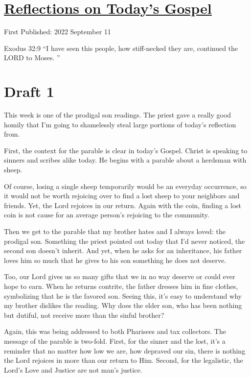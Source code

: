 \documentclass[12pt]{article}[titlepage]
\newcommand{\say}[1]{``#1''}
\newcommand{\1}{\={a}}
\newcommand{\2}{\={e}}
\newcommand{\3}{\={\i}}
\newcommand{\4}{\=o}
\newcommand{\5}{\=u}
\newcommand{\6}{\={A}}
\renewcommand{\,}{\textsuperscript{,}}
\begin{document}
\doublespacing
\section{\href{reflections-on-readings-24-ordinary-c-22.html}{Reflections on Today's Gospel}}
First Published: 2022 September 11

Exodus 32:9 \say{I have seen this people, how stiff-necked they are, continued the LORD to Moses. }

\section{Draft 1}
This week is one of the prodigal son readings.
The priest gave a really good homily that I'm going to shamelessly steal large portions of today's reflection from.

First, the context for the parable is clear in today's Gospel.
Christ is speaking to sinners and scribes alike today.
He begins with a parable about a herdsman with sheep.

Of course, losing a single sheep temporarily would be an everyday occurrence, so it would not be worth rejoicing over to find a lost sheep to your neighbors and friends.
Yet, the Lord rejoices in our return.
Again with the coin, finding a lost coin is not cause for an average person's rejoicing to the community.

Then we get to the parable that my brother hates and I always loved: the prodigal son.
Something the priest pointed out today that I'd never noticed, the second son doesn't inherit.
And yet, when he asks for an inheritance, his father loves him so much that he gives to his son something he does not deserve.

Too, our Lord gives us so many gifts that we in no way deserve or could ever hope to earn.
When he returns contrite, the father dresses him in fine clothes, symbolizing that he is the favored son.
Seeing this, it's easy to understand why my brother dislikes the reading.
Why does the elder son, who has been nothing but dutiful, not receive more than the sinful brother?

Again, this was being addressed to both Pharisees and tax collectors.
The message of the parable is two-fold.
First, for the sinner and the lost, it's a reminder that no matter how low we are, how depraved our sin, there is nothing the Lord rejoices in more than our return to Him.
Second, for the legalistic, the Lord's Love and Justice are not man's justice.
\end{document}
